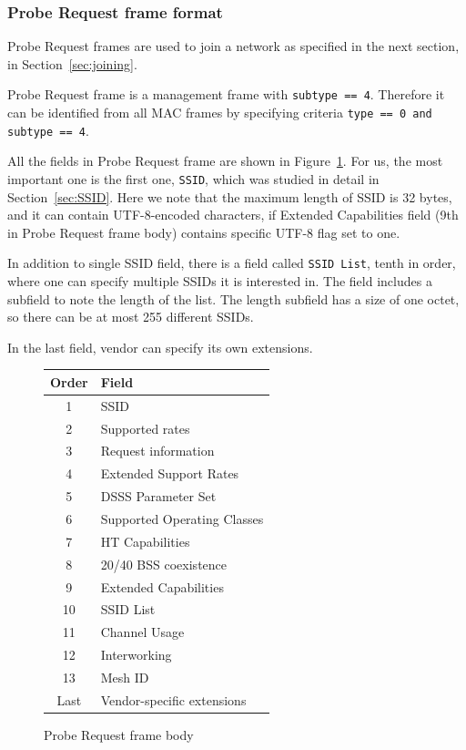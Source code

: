 \documentclass[12pt,a4paper,oneside,pdftex]{report}
\begin{document}
\subsubsection{Probe Request frame format}
\label{subsubsec:probe_request}

Probe Request frames are used to join a network as specified in the next section, in Section~\ref{sec:joining}.

Probe Request frame is a management frame with \texttt{subtype == 4}. Therefore it can be identified from all MAC frames by specifying criteria \texttt{type == 0 and subtype == 4}. 

All the fields in Probe Request frame are shown in Figure~\ref{fig:probe_request}. For us, the most important one is the first one, \texttt{SSID}, which was studied in detail in Section~\ref{sec:SSID}. Here we note that the maximum length of SSID is 32 bytes, and it can contain UTF-8-encoded characters, if Extended Capabilities field (9th in Probe Request frame body) contains specific UTF-8 flag set to one.

In addition to single SSID field, there is a field called \texttt{SSID List}, tenth in order, where one can specify multiple SSIDs it is interested in. The field includes a subfield to note the length of the list. The length subfield has a size of one octet, so there can be at most 255 different SSIDs.

In the last field, vendor can specify its own extensions.

\begin{figure}
\center
\label{fig:probe_request}
\begin{tabular}{|c|l|}
    \hline
    Order & Field \\ \hline
    \hline
    1 & SSID \\ \hline
    2 & Supported rates \\ \hline
    3 & Request information \\ \hline
    4 & Extended Support Rates \\ \hline
    5 & DSSS Parameter Set \\ \hline
    6 & Supported Operating Classes \\ \hline
    7 & HT Capabilities \\ \hline
    8 & 20/40 BSS coexistence \\ \hline
    9 & Extended Capabilities \\ \hline
    10 & SSID List \\ \hline
    11 & Channel Usage \\ \hline
    12 & Interworking \\ \hline
    13 & Mesh ID \\ \hline
    Last & Vendor-specific extensions \\ \hline
\end{tabular}
\caption{Probe Request frame body}
\end{figure}
\end{document}
